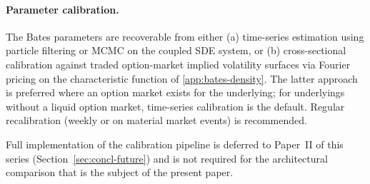 \documentclass[preprint,12pt,authoryear]{elsarticle}
\theoremstyle{definition}
\begin{document}
\paragraph{Parameter calibration.} The Bates parameters are
recoverable from either (a) time-series estimation using
particle filtering or MCMC on the coupled SDE system, or (b)
cross-sectional calibration against traded option-market implied
volatility surfaces via Fourier pricing on the characteristic
function of \ref{app:bates-density}. The latter approach
is preferred where an option market exists for the underlying;
for underlyings without a liquid option market, time-series
calibration is the default. Regular recalibration (weekly or on
material market events) is recommended.

Full implementation of the calibration pipeline is deferred to
Paper~II of this series (Section~\ref{sec:concl-future}) and is
not required for the architectural comparison that is the
subject of the present paper.



\end{document}

